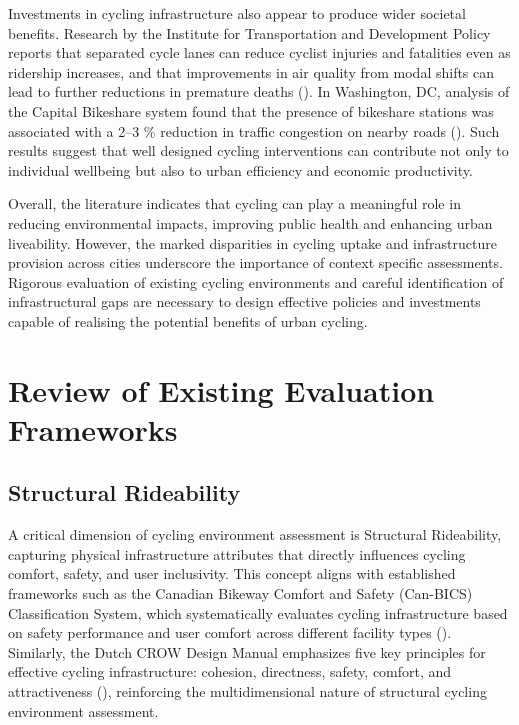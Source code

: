 \documentclass[
  12pt,
  oneside]{book}
\begin{document}
Investments in cycling infrastructure also appear to produce wider societal benefits. Research by the Institute for Transportation and Development Policy reports that separated cycle lanes can reduce cyclist injuries and fatalities even as ridership increases, and that improvements in air quality from modal shifts can lead to further reductions in premature deaths (\textcite{yanocha_economic_2022}). In Washington, DC, analysis of the Capital Bikeshare system found that the presence of bikeshare stations was associated with a 2--3 \% reduction in traffic congestion on nearby roads (\textcite{wichman_commentary_nodate}). Such results suggest that well designed cycling interventions can contribute not only to individual wellbeing but also to urban efficiency and economic productivity.

Overall, the literature indicates that cycling can play a meaningful role in reducing environmental impacts, improving public health and enhancing urban liveability. However, the marked disparities in cycling uptake and infrastructure provision across cities underscore the importance of context specific assessments. Rigorous evaluation of existing cycling environments and careful identification of infrastructural gaps are necessary to design effective policies and investments capable of realising the potential benefits of urban cycling.

\section{Review of Existing Evaluation Frameworks}\label{review-of-existing-evaluation-frameworks}

\subsection{Structural Rideability}\label{structural-rideability}

A critical dimension of cycling environment assessment is Structural Rideability, capturing physical infrastructure attributes that directly influences cycling comfort, safety, and user inclusivity. This concept aligns with established frameworks such as the Canadian Bikeway Comfort and Safety (Can-BICS) Classification System, which systematically evaluates cycling infrastructure based on safety performance and user comfort across different facility types (\textcite{ferster_developing_2023}). Similarly, the Dutch CROW Design Manual emphasizes five key principles for effective cycling infrastructure: cohesion, directness, safety, comfort, and attractiveness (\textcite{crow_design_2016}), reinforcing the multidimensional nature of structural cycling environment assessment.
\end{document}
